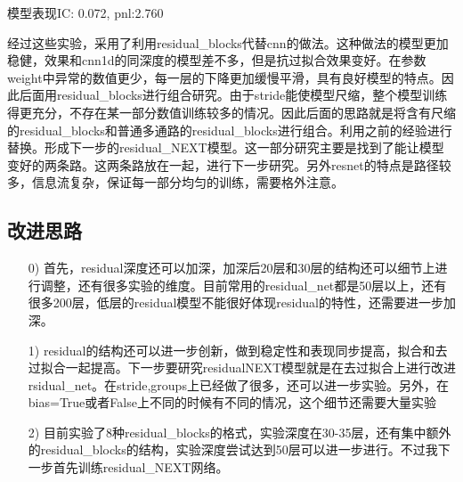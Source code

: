\documentclass[11pt]{ctexart}
\begin{document}
模型表现{\kaishu \small IC: 0.072, pnl:2.760}

经过这些实验，采用了利用residual\_blocks代替cnn的做法。这种做法的模型更加稳健，效果和cnn1d的同深度的模型差不多，但是抗过拟合效果变好。在参数weight中异常的数值更少，每一层的下降更加缓慢平滑，具有良好模型的特点。因此后面用residual\_blocks进行组合研究。由于stride能使模型尺缩，整个模型训练得更充分，不存在某一部分数值训练较多的情况。因此后面的思路就是将含有尺缩的residual\_blocks和普通多通路的residual\_blocks进行组合。利用之前的经验进行替换。形成下一步的residual\_NEXT模型。这一部分研究主要是找到了能让模型变好的两条路。这两条路放在一起，进行下一步研究。另外resnet的特点是路径较多，信息流复杂，保证每一部分均匀的训练，需要格外注意。


\subsection{改进思路}
\begin{itemize}
  \item [0)]
    首先，residual深度还可以加深，加深后20层和30层的结构还可以细节上进行调整，还有很多实验的维度。目前常用的residual\_net都是50层以上，还有很多200层，低层的residual模型不能很好体现residual的特性，还需要进一步加深。
  \item [1)]
    residual的结构还可以进一步创新，做到稳定性和表现同步提高，拟合和去过拟合一起提高。下一步要研究residualNEXT模型就是在去过拟合上进行改进rsidual\_net。在stride,groups上已经做了很多，还可以进一步实验。另外，在bias=True或者False上不同的时候有不同的情况，这个细节还需要大量实验
  \item [2)]
    目前实验了8种residual\_blocks的格式，实验深度在30-35层，还有集中额外的residual\_blocks的结构，实验深度尝试达到50层可以进一步进行。不过我下一步首先训练residual\_NEXT网络。
\end{itemize}
\end{document}
